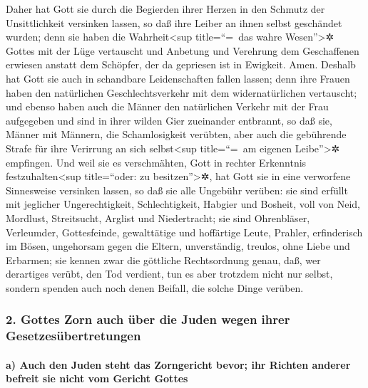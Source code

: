  Daher hat Gott sie durch die Begierden ihrer Herzen in
den Schmutz der Unsittlichkeit versinken lassen, so daß ihre Leiber an
ihnen selbst geschändet wurden;  denn sie haben die
Wahrheit\textless sup title=``=~das wahre Wesen''\textgreater✲ Gottes
mit der Lüge vertauscht und Anbetung und Verehrung dem Geschaffenen
erwiesen anstatt dem Schöpfer, der da gepriesen ist in Ewigkeit. Amen.
 Deshalb hat Gott sie auch in schandbare Leidenschaften
fallen lassen; denn ihre Frauen haben den natürlichen Geschlechtsverkehr
mit dem widernatürlichen vertauscht;  und ebenso haben
auch die Männer den natürlichen Verkehr mit der Frau aufgegeben und sind
in ihrer wilden Gier zueinander entbrannt, so daß sie, Männer mit
Männern, die Schamlosigkeit verübten, aber auch die gebührende Strafe
für ihre Verirrung an sich selbst\textless sup title=``=~am eigenen
Leibe''\textgreater✲ empfingen.  Und weil sie es
verschmähten, Gott in rechter Erkenntnis festzuhalten\textless sup
title=``oder: zu besitzen''\textgreater✲, hat Gott sie in eine
verworfene Sinnesweise versinken lassen, so daß sie alle Ungebühr
verüben:  sie sind erfüllt mit jeglicher Ungerechtigkeit,
Schlechtigkeit, Habgier und Bosheit, voll von Neid, Mordlust,
Streitsucht, Arglist und Niedertracht;  sie sind
Ohrenbläser, Verleumder, Gottesfeinde, gewalttätige und hoffärtige
Leute, Prahler, erfinderisch im Bösen, ungehorsam gegen die Eltern,
 unverständig, treulos, ohne Liebe und Erbarmen;
 sie kennen zwar die göttliche Rechtsordnung genau, daß,
wer derartiges verübt, den Tod verdient, tun es aber trotzdem nicht nur
selbst, sondern spenden auch noch denen Beifall, die solche Dinge
verüben.

\hypertarget{gottes-zorn-auch-uxfcber-die-juden-wegen-ihrer-gesetzesuxfcbertretungen}{%
\subsubsection{2. Gottes Zorn auch über die Juden wegen ihrer
Gesetzesübertretungen}\label{gottes-zorn-auch-uxfcber-die-juden-wegen-ihrer-gesetzesuxfcbertretungen}}

\hypertarget{a-auch-den-juden-steht-das-zorngericht-bevor-ihr-richten-anderer-befreit-sie-nicht-vom-gericht-gottes}{%
\paragraph{a) Auch den Juden steht das Zorngericht bevor; ihr Richten
anderer befreit sie nicht vom Gericht
Gottes}\label{a-auch-den-juden-steht-das-zorngericht-bevor-ihr-richten-anderer-befreit-sie-nicht-vom-gericht-gottes}}

